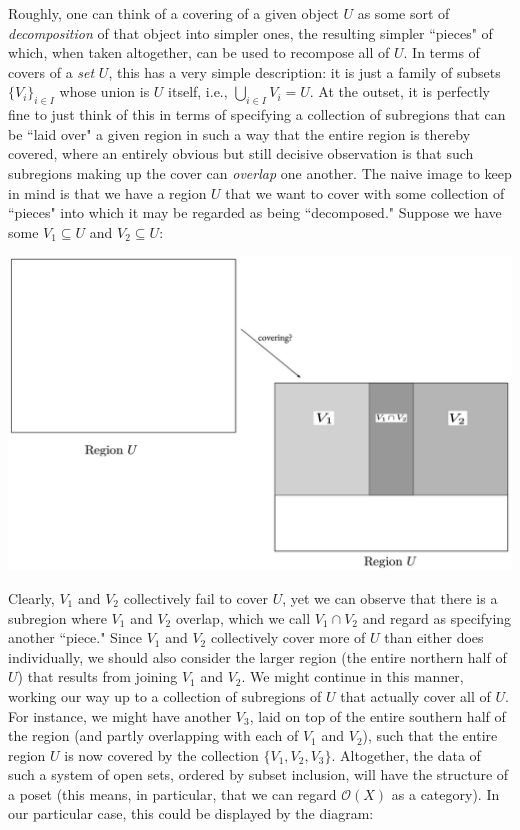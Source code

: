 \documentclass[a4paper]{book}
\theoremstyle{definition}
\theoremstyle{definition}
\theoremstyle{definition}
\theoremstyle{theorem}
\theoremstyle{definition}
\begin{document}
		 Roughly, one can think of a covering of a given object $U$ as some sort of \textit{decomposition} of that object into simpler ones, the resulting simpler ``pieces" of which, when taken altogether, can be used to recompose all of $U$. In terms of covers of a \textit{set} $U$, this has a very simple description: it is just a family of subsets $\{V_i\}_{i \in I}$ whose union is $U$ itself, i.e., $\bigcup_{i \in I} V_i = U$. At the outset, it is perfectly fine to just think of this in terms of specifying a collection of subregions that can be ``laid over" a given region in such a way that the entire region is thereby covered, where an entirely obvious but still decisive observation is that such subregions making up the cover can \textit{overlap} one another. The naive image to keep in mind is that we have a region $U$ that we want to cover with some collection of ``pieces" into which it may be regarded as being ``decomposed." Suppose we have some $V_1 \subseteq  U$ and $V_2 \subseteq  U$:
		\begin{center} 
		\includegraphics*[scale=0.23]{covering2.png} 
		\end{center} \par \noindent
		Clearly, $V_1$ and $V_2$ collectively fail to cover $U$, yet we can observe that there is a subregion where $V_1$ and $V_2$ overlap, which we call $V_1 \cap V_2$ and regard as specifying another ``piece." Since $V_1$ and $V_2$ collectively cover more of $U$ than either does individually, we should also consider the larger region (the entire northern half of $U$) that results from joining $V_1$ and $V_2$. 
		We might continue in this manner, working our way up to a collection of subregions of $U$ that actually cover all of $U$. For instance, we might have another $V_3$, laid on top of the entire southern half of the region (and partly overlapping with each of $V_1$ and $V_2$), such that the entire region $U$ is now covered by the collection $\{V_1, V_2, V_3\}$. Altogether, the data of such a system of open sets, ordered by subset inclusion, will have the structure of a poset (this means, in particular, that we can regard $\mathscr{O}(X)$ as a category). In our particular case, this could be displayed by the diagram: 
\end{document}
